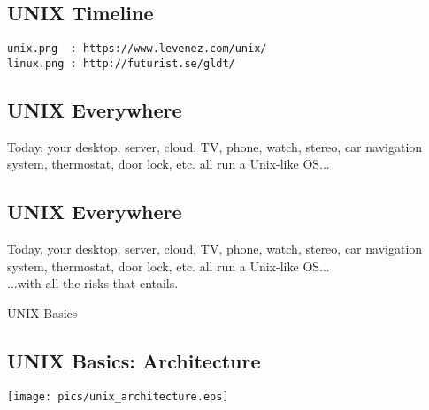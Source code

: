 \documentclass[sxga]{xdvislides}
\begin{document}
\subsection{UNIX Timeline}
\Hugesize
\vspace*{\fill}
\begin{center}
\begin{verbatim}
unix.png  : https://www.levenez.com/unix/
linux.png : http://futurist.se/gldt/
\end{verbatim}
\end{center}
\vspace*{\fill}
\Normalsize



\subsection{UNIX Everywhere}
\Hugesize
\vspace*{\fill}
\begin{center}
Today, your desktop, server, cloud, TV, phone, watch, stereo, car
navigation system, thermostat, door lock, etc. all run a Unix-like OS... \\
\end{center}
\vspace*{\fill}
\Normalsize

\subsection{UNIX Everywhere}
\Hugesize
\vspace*{\fill}
\begin{center}
Today, your desktop, server, cloud, TV, phone, watch, stereo, car
navigation system, thermostat, door lock, etc. all run a Unix-like OS... \\
\vspace{.5in}
...with all the risks that entails.
\end{center}
\vspace*{\fill}
\Normalsize

\pagebreak

\vspace*{\fill}
\begin{center}
  \Hugesize
    UNIX Basics
	\hspace*{5mm}\blueline\\ [1em]
  \Normalsize
\end{center}
\vspace*{\fill}

\subsection{UNIX Basics: Architecture}
\begin{center}
\texttt{[image: pics/unix\_architecture.eps]}
\end{center}
\end{document}
